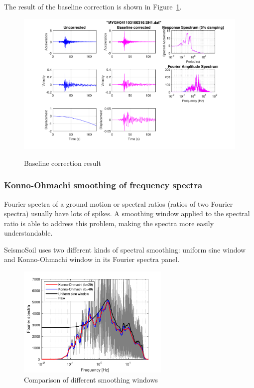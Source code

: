 \documentclass[11pt,letterpaper]{article}
\begin{document}
The result of the baseline correction is shown in Figure~\ref{fig:baseline_result_duplicate}.%

\begin{figure}[H]
	\centering
	\includegraphics[width=.97\textwidth]{baseline_correction_result_new.pdf}\\
	\caption{Baseline correction result}
	\label{fig:baseline_result_duplicate}
\end{figure}

\subsubsection{Konno-Ohmachi smoothing of frequency spectra}\label{sec:konno-ohmachi}

Fourier spectra of a ground motion or spectral ratios (ratios of two Fourier spectra) usually have lots of spikes. A smoothing window applied to the spectral ratio is able to address this problem, making the spectra more easily understandable.

SeismoSoil uses two different kinds of spectral smoothing: uniform sine window and Konno-Ohmachi window in its Fourier spectra panel.

\begin{figure}[h]
	\centering
	\includegraphics[width=0.65\textwidth]{different_smoothing_windows.pdf}
	\caption{Comparison of different smoothing windows}\label{fig:different_smoothing_windows}
\end{figure}
\end{document}
